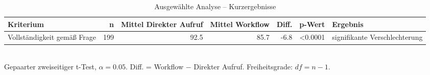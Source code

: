 \begin{table}[htbp]
\centering
\caption{Ausgewählte Analyse -- Kurzergebnisse}
\begin{tabular}{lrrrrrl}
\toprule
Kriterium & n & Mittel Direkter Aufruf & Mittel Workflow & Diff. & p-Wert & Ergebnis \\
\midrule
Vollständigkeit gemäß Frage & 199 & 92.5 & 85.7 & -6.8 & <0.0001 & signifikante Verschlechterung \\
\bottomrule
\end{tabular}
\\[2mm]
\footnotesize Gepaarter zweiseitiger t-Test, $\alpha=0.05$. Diff. = Workflow $-$ Direkter Aufruf. Freiheitsgrade: $df=n-1$.
\end{table}
